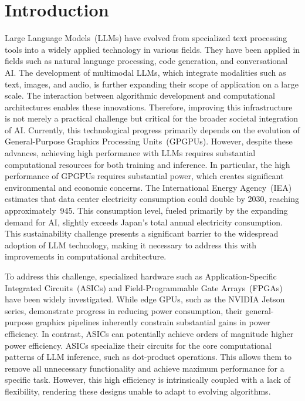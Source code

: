 \section{Introduction}
Large Language Models~(LLMs) have evolved from specialized text processing tools into a widely applied technology in various fields\nobreak\cite{LLM_survey1,LLM_survey2,LLM_survey3,LLM_survey4,LLM_survey5}.
They have been applied in fields such as natural language processing\nobreak\cite{NLP_survey1,NLP_survey2,NLP_survey3}, code generation\nobreak\cite{code_generation1,code_generation2,code_generation3}, and conversational AI\nobreak\cite{conversational_agents1,conversational_agents2}.
The development of multimodal LLMs, which integrate modalities such as text, images, and audio, is further expanding their scope of application on a large scale\nobreak\cite{multi-modal1,multi-modal4,multi-modal5}. 
The interaction between algorithmic development and computational architectures enables these innovations.
Therefore, improving this infrastructure is not merely a practical challenge but critical for the broader societal integration of AI.
Currently, this technological progress primarily depends on the evolution of General-Purpose Graphics Processing Units~(GPGPUs).
However, despite these advances, achieving high performance with LLMs requires substantial computational resources for both training and inference.
In particular, the high performance of GPGPUs requires substantial power, which creates significant environmental and economic concerns\nobreak\cite{gpu_power1,gpu_power2}. 
The International Energy Agency~(IEA) estimates that data center electricity consumption could double by 2030, reaching approximately~\SI{945}{\TWh}\nobreak\cite{iea_energy_ai}. 
This consumption level, fueled primarily by the expanding demand for AI, slightly exceeds Japan's total annual electricity consumption.
This sustainability challenge presents a significant barrier to the widespread adoption of LLM technology, making it necessary to address this with improvements in computational architecture.

To address this challenge, specialized hardware such as Application-Specific Integrated Circuits~(ASICs) and Field-Programmable Gate Arrays~(FPGAs) have been widely investigated.
While edge GPUs, such as the NVIDIA Jetson series, demonstrate progress in reducing power consumption, their general-purpose graphics pipelines inherently constrain substantial gains in power efficiency.
In contrast, ASICs can potentially achieve orders of magnitude higher power efficiency. 
ASICs specialize their circuits for the core computational patterns of LLM inference, such as dot-product operations. 
This allows them to remove all unnecessary functionality and achieve maximum performance for a specific task.
However, this high efficiency is intrinsically coupled with a lack of flexibility, rendering these designs unable to adapt to evolving algorithms.


